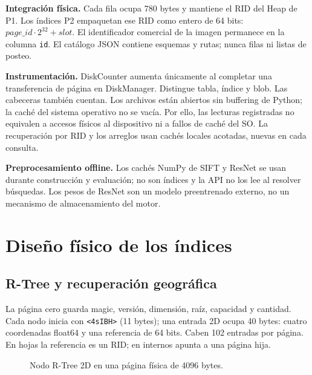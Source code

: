 \documentclass[11pt,a4paper]{article}
\newcommand{\code}[1]{\texttt{#1}}
\begin{document}
\textbf{Integración física.} Cada fila ocupa 780 bytes y mantiene el RID del Heap de P1. Los índices P2 empaquetan ese RID como entero de 64 bits: $page\_id\cdot 2^{32}+slot$. El identificador comercial de la imagen permanece en la columna \code{id}. El catálogo JSON contiene esquemas y rutas; nunca filas ni listas de posteo.

\textbf{Instrumentación.} DiskCounter aumenta únicamente al completar una transferencia de página en DiskManager. Distingue tabla, índice y blob. Las cabeceras también cuentan. Los archivos están abiertos sin buffering de Python; la caché del sistema operativo no se vacía. Por ello, las lecturas registradas no equivalen a accesos físicos al dispositivo ni a fallos de caché del SO. La recuperación por RID y los arreglos usan cachés locales acotadas, nuevas en cada consulta.

\textbf{Preprocesamiento offline.} Los cachés NumPy de SIFT y ResNet se usan durante construcción y evaluación; no son índices y la API no los lee al resolver búsquedas. Los pesos de ResNet son un modelo preentrenado externo, no un mecanismo de almacenamiento del motor.

\section{Diseño físico de los índices}
\subsection{R-Tree y recuperación geográfica}
La página cero guarda magic, versión, dimensión, raíz, capacidad y cantidad. Cada nodo inicia con \code{<4sIBH>} (11 bytes); una entrada 2D ocupa 40 bytes: cuatro coordenadas float64 y una referencia de 64 bits. Caben 102 entradas por página. En hojas la referencia es un RID; en internos apunta a una página hija.

\begin{figure}[H]\centering
{}
\caption{Nodo R-Tree 2D en una página física de 4096 bytes.}
\end{figure}
\end{document}
